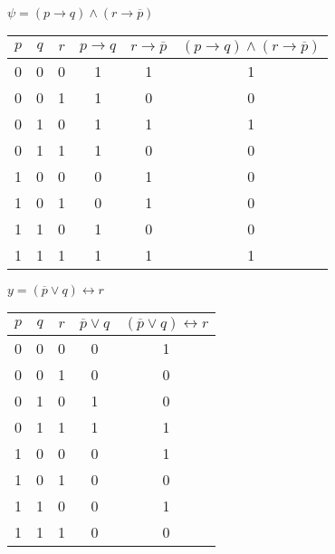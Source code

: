 \documentclass[10pt, a4paper]{exam}
\begin{document}
\begin{questions}
\begin{parts}
\begin{solution}
      $\psi=(p\rightarrow q)\wedge(r\rightarrow\overline{p})$
      \begin{tabular}{c|c|c|c|c|c}
        $p$ & $q$ & $r$ & $p\rightarrow q$ & $r\rightarrow\overline{p}$ & $(p\rightarrow q)\wedge(r\rightarrow\overline{p})$ \\\hline
        0   & 0   & 0   & 1                & 1                          & 1                                                  \\
        0   & 0   & 1   & 1                & 0                          & 0                                                  \\
        0   & 1   & 0   & 1                & 1                          & 1                                                  \\
        0   & 1   & 1   & 1                & 0                          & 0                                                  \\
        1   & 0   & 0   & 0                & 1                          & 0                                                  \\
        1   & 0   & 1   & 0                & 1                          & 0                                                  \\
        1   & 1   & 0   & 1                & 0                          & 0                                                  \\
        1   & 1   & 1   & 1                & 1                          & 1
      \end{tabular}

      $y=(\overline{p}\vee q)\leftrightarrow r$
      \begin{tabular}{c|c|c|c|c}
        $p$ & $q$ & $r$ & $\overline{p}\vee q$ & $(\overline{p}\vee q)\leftrightarrow r$ \\\hline
        0   & 0   & 0   & 0                    & 1                                       \\
        0   & 0   & 1   & 0                    & 0                                       \\
        0   & 1   & 0   & 1                    & 0                                       \\
        0   & 1   & 1   & 1                    & 1                                       \\
        1   & 0   & 0   & 0                    & 1                                       \\
        1   & 0   & 1   & 0                    & 0                                       \\
        1   & 1   & 0   & 0                    & 1                                       \\
        1   & 1   & 1   & 0                    & 0
      \end{tabular}
    \end{solution}


\end{parts}
\end{questions}
\end{document}

